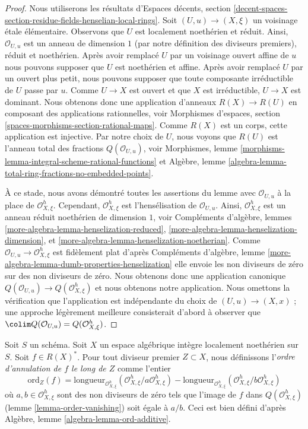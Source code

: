 \begin{proof}
Nous utiliserons les résultats d'Espaces décents, section
\ref{decent-spaces-section-residue-fields-henselian-local-rings}.
Soit $(U, u) \to (X, \xi)$ un voisinage \'etale élémentaire.
Observons que $U$ est localement noethérien et réduit.
Ainsi, $\mathcal{O}_{U, u}$ est un anneau de dimension $1$
(par notre définition des diviseurs premiers),
réduit et noethérien.
Après avoir remplacé $U$ par un voisinage ouvert affine de $u$
nous pouvons supposer que $U$ est noethérien et affine.
Après avoir remplacé $U$ par un ouvert plus petit, nous pouvons supposer que toute
composante irréductible de $U$ passe par $u$.
Comme $U \to X$ est ouvert et que $X$ est irréductible, $U \to X$ est dominant.
Nous obtenons donc une application d'anneaux $R(X) \to R(U)$ en composant des applications rationnelles, voir
Morphismes d'espaces, section \ref{spaces-morphisms-section-rational-maps}.
Comme $R(X)$ est un corps, cette application est injective.
Par notre choix de $U$, nous voyons que $R(U)$ est l'anneau total des fractions
$Q(\mathcal{O}_{U, u})$, voir
Morphismes, lemme \ref{morphisms-lemma-integral-scheme-rational-functions}
et
Algèbre, lemme \ref{algebra-lemma-total-ring-fractions-no-embedded-points}.

\medskip\noindent
À ce stade, nous avons démontré toutes les assertions du lemme avec
$\mathcal{O}_{U, u}$ à la place de $\mathcal{O}_{X, \xi}^h$.
Cependant, $\mathcal{O}_{X, \xi}^h$ est l'hensélisation de
$\mathcal{O}_{U, u}$. Ainsi, $\mathcal{O}_{X, \xi}^h$ est un anneau
réduit noethérien de dimension $1$, voir
Compléments d'algèbre, lemmes
\ref{more-algebra-lemma-henselization-reduced},
\ref{more-algebra-lemma-henselization-dimension}, et
\ref{more-algebra-lemma-henselization-noetherian}.
Comme $\mathcal{O}_{U, u} \to \mathcal{O}_{X, \xi}^h$ est
fidèlement plat d'après Compléments d'algèbre, lemme
\ref{more-algebra-lemma-dumb-properties-henselization}
elle envoie les non diviseurs de zéro sur des non diviseurs de zéro.
Nous obtenons donc une application canonique
$Q(\mathcal{O}_{U, u}) \to Q(\mathcal{O}_{X, \xi}^h)$
et nous obtenons notre application.
Nous omettons la vérification que l'application est indépendante du
choix de $(U, u) \to (X, x)$ ; une approche légèrement meilleure
consisterait d'abord à observer que
$\colim Q(\mathcal{O}_{U, u}) = Q(\mathcal{O}_{X, \xi}^h)$.
\end{proof}

\begin{definition}
\label{definition-order-vanishing}
Soit $S$ un schéma. Soit $X$ un espace algébrique intègre localement noethérien
sur $S$. Soit $f \in R(X)^*$. Pour tout diviseur premier
$Z \subset X$, nous définissons l'{\it ordre d'annulation de $f$ le long de $Z$}
comme l'entier
$$
\text{ord}_Z(f) =
\text{longueur}_{\mathcal{O}_{X, \xi}^h}
(\mathcal{O}_{X, \xi}^h/a \mathcal{O}_{X, \xi}^h) -
\text{longueur}_{\mathcal{O}_{X, \xi}^h}
(\mathcal{O}_{X, \xi}^h/b \mathcal{O}_{X, \xi}^h)
$$
où $a, b \in \mathcal{O}_{X, \xi}^h$ sont des non diviseurs de zéro
tels que l'image de $f$ dans $Q(\mathcal{O}_{X, \xi}^h)$
(lemme \ref{lemma-order-vanishing}) soit égale à $a/b$.
Ceci est bien défini d'après
Algèbre, lemme \ref{algebra-lemma-ord-additive}.
\end{definition}

